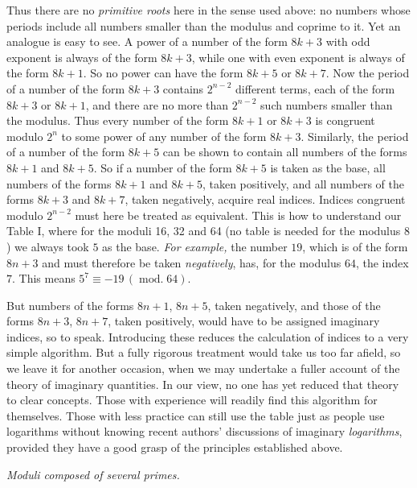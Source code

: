 Thus there are no \emph{primitive roots} here in the sense used above: no numbers whose periods include all numbers smaller than the modulus and coprime to it. Yet an analogue is easy to see. A power of a number of the form $8k+3$ with odd exponent is always of the form $8k+3$, while one with even exponent is always of the form $8k+1$. So no power can have the form $8k+5$ or $8k+7$. Now the period of a number of the form $8k+3$ contains $2^{n-2}$ different terms, each of the form $8k+3$ or $8k+1$, and there are no more than $2^{n-2}$ such numbers smaller than the modulus. Thus every number of the form $8k+1$ or $8k+3$ is congruent modulo $2^n$ to some power of any number of the form $8k+3$. Similarly, the period of a number of the form $8k+5$ can be shown to contain all numbers of the forms $8k+1$ and $8k+5$. So if a number of the form $8k+5$ is taken as the base, all numbers of the forms $8k+1$ and $8k+5$, taken positively, and all numbers of the forms $8k+3$ and $8k+7$, taken negatively, acquire real indices. Indices congruent modulo $2^{n-2}$ must here be treated as equivalent. This is how to understand our Table I, where for the moduli 16, 32 and 64
(no table is needed for the modulus $8$) we always took $5$ as the base. \emph{For example,} the number $19$, which is of the form $8n+3$ and must therefore be taken \emph{negatively}, has, for the modulus $64$, the index $7$. This means $5^7\equiv-19\,(\operatorname{mod.}64)$.

But numbers of the forms $8n+1$, $8n+5$, taken negatively, and those of the forms $8n+3$, $8n+7$, taken positively, would have to be assigned imaginary indices, so to speak. Introducing these reduces the calculation of indices to a very simple algorithm. But a fully rigorous treatment would take us too far afield, so we leave it for another occasion, when we may undertake a fuller account of the theory of imaginary quantities. In our view, no one has yet reduced that theory to clear concepts. Those with experience will readily find this algorithm for themselves. Those with less practice can still use the table just as people use logarithms without knowing recent authors’ discussions of imaginary \emph{logarithms}, provided they have a good grasp of the principles established above.

\begin{center}\small\emph{Moduli composed of several primes.}\end{center}

